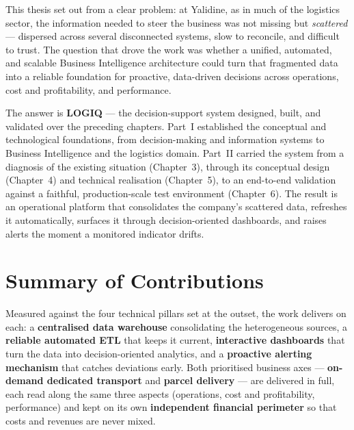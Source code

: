 
This thesis set out from a clear problem: at Yalidine, as in much of the logistics sector, the
information needed to steer the business was not missing but \emph{scattered} --- dispersed across
several disconnected systems, slow to reconcile, and difficult to trust. The question that drove the work
was whether a unified, automated, and scalable Business Intelligence architecture could turn that
fragmented data into a reliable foundation for proactive, data-driven decisions across operations, cost
and profitability, and performance.

The answer is \textbf{LOGIQ} --- the decision-support system designed, built, and validated over the
preceding chapters. Part~I established the conceptual and technological foundations, from
decision-making and information systems to Business Intelligence and the logistics domain. Part~II
carried the system from a diagnosis of the existing situation (Chapter~3), through its conceptual design
(Chapter~4) and technical realisation (Chapter~5), to an end-to-end validation against a faithful,
production-scale test environment (Chapter~6). The result is an operational platform that consolidates
the company's scattered data, refreshes it automatically, surfaces it through decision-oriented
dashboards, and raises alerts the moment a monitored indicator drifts.

\section*{Summary of Contributions}

Measured against the four technical pillars set at the outset, the work delivers on each: a \textbf{centralised
data warehouse} consolidating the heterogeneous sources, a \textbf{reliable automated ETL} that keeps it
current, \textbf{interactive dashboards} that turn the data into decision-oriented analytics, and a
\textbf{proactive alerting mechanism} that catches deviations early. Both prioritised business axes ---
\textbf{on-demand dedicated transport} and \textbf{parcel delivery} --- are delivered in full, each read
along the same three aspects (operations, cost and profitability, performance) and kept on its own
\textbf{independent financial perimeter} so that costs and revenues are never mixed.

